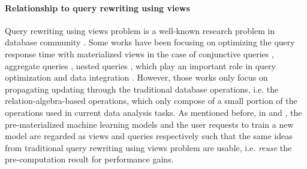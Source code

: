 \paragraph{Relationship to query rewriting using views} Query rewriting using views problem is a well-known research problem in database community \cite{halevy2001answering}. Some works have been focusing on optimizing the query response time with materialized views in the case of conjunctive queries \cite{chandra1977optimal, chaudhuri1995optimizing, pottinger2000scalable, afrati2007using}, aggregate queries \cite{cohen2007deciding, cohen1999rewriting, srivastava1996answering, galindo2001orthogonal}, nested queries \cite{zaharioudakis2000answering}, which play an important role in query optimization and data integration \cite{halevy2001answering}. However, those works only focus on propagating updating through the traditional database operations, i.e. the relation-algebra-based operations, which only compose of a small portion of the operations used in current data analysis tasks. As mentioned before, in \cite{gupta2015processing} and \cite{hasani2018efficient}, the pre-materialized machine learning models and the user requests to train a new model are regarded as views and queries respectively such that the same ideas from traditional query rewriting using views problem are usable, i.e. {\em reuse} the pre-computation result for performance gains.

